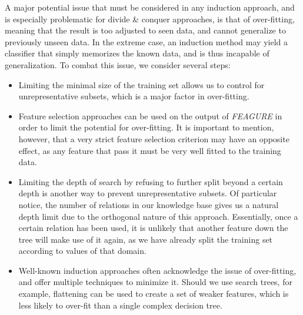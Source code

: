\documentclass[twoside,11pt]{article}
\theoremstyle{definition}
\begin{document}
A major potential issue that must be considered in any induction approach, and is especially problematic for divide \& conquer approaches, is that of over-fitting, meaning that the result is too adjusted to seen data, and cannot generalize to previously unseen data. In the extreme case, an induction method may yield a classifier that simply memorizes the known data, and is thus incapable of generalization.
To combat this issue, we consider several steps:
\begin{itemize}
	\item Limiting the minimal size of the training set allows us to control for unrepresentative subsets, which is a major factor in over-fitting.
	\item Feature selection approaches can be used on the output of \emph{FEAGURE} in order to limit the potential for over-fitting. It is important to mention, however, that a very strict feature selection criterion may have an opposite effect, as any feature that pass it must be very well fitted to the training data.
	\item Limiting the depth of search by refusing to further split beyond a certain depth is another way to prevent unrepresentative subsets. Of particular notice, the number of relations in our knowledge base gives us a natural depth limit due to the orthogonal nature of this approach. Essentially, once a certain relation has been used, it is unlikely that another feature down the tree will make use of it again, as we have already split the training set according to values of that domain. 
	\item Well-known induction approaches often acknowledge the issue of over-fitting, and offer multiple techniques to minimize it. Should we use search trees, for example, flattening can be used to create a set of weaker features, which is less likely to over-fit than a single complex decision tree.
\end{itemize}
\end{document}
